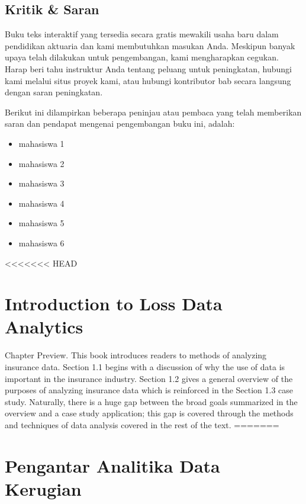 \documentclass[
]{book}
\providecommand{\tightlist}{%
  \setlength{\itemsep}{0pt}\setlength{\parskip}{0pt}}
\begin{document}
\hypertarget{kritik-saran}{%
\section*{Kritik \& Saran}\label{kritik-saran}}

Buku teks interaktif yang tersedia secara gratis mewakili usaha baru dalam pendidikan aktuaria dan kami membutuhkan masukan Anda. Meskipun banyak upaya telah dilakukan untuk pengembangan, kami mengharapkan cegukan. Harap beri tahu instruktur Anda tentang peluang untuk peningkatan, hubungi kami melalui situs proyek kami, atau hubungi kontributor bab secara langsung dengan saran peningkatan.

Berikut ini dilampirkan beberapa peninjau atau pembaca yang telah memberikan saran dan pendapat mengenai pengembangan buku ini, adalah:

\begin{itemize}
\tightlist
\item
  mahasiswa 1
\item
  mahasiswa 2
\item
  mahasiswa 3
\item
  mahasiswa 4
\item
  mahasiswa 5
\item
  mahasiswa 6
\end{itemize}

<<<<<<< HEAD
\hypertarget{introduction-to-loss-data-analytics}{%
\chapter{Introduction to Loss Data Analytics}\label{introduction-to-loss-data-analytics}}

Chapter Preview. This book introduces readers to methods of analyzing insurance data. Section 1.1 begins with a discussion of why the use of data is important in the insurance industry. Section 1.2 gives a general overview of the purposes of analyzing insurance data which is reinforced in the Section 1.3 case study. Naturally, there is a huge gap between the broad goals summarized in the overview and a case study application; this gap is covered through the methods and techniques of data analysis covered in the rest of the text.
=======
\hypertarget{pengantar-analitika-data-kerugian}{%
\chapter{Pengantar Analitika Data Kerugian}\label{pengantar-analitika-data-kerugian}}
\end{document}

